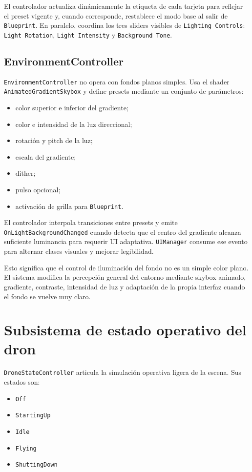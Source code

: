 \documentclass[12pt,letterpaper]{article}
\begin{document}
\noindent El controlador actualiza dinámicamente la etiqueta de cada tarjeta para reflejar el preset vigente y, cuando corresponde, restablece el modo base al salir de \texttt{Blueprint}. En paralelo, coordina los tres sliders visibles de \texttt{Lighting Controls}: \texttt{Light Rotation}, \texttt{Light Intensity} y \texttt{Background Tone}.

\subsection{EnvironmentController}
\texttt{EnvironmentController} no opera con fondos planos simples. Usa el shader \texttt{AnimatedGradientSkybox} y define presets mediante un conjunto de parámetros:
\begin{itemize}
    \item color superior e inferior del gradiente;
    \item color e intensidad de la luz direccional;
    \item rotación y pitch de la luz;
    \item escala del gradiente;
    \item dither;
    \item pulso opcional;
    \item activación de grilla para \texttt{Blueprint}.
\end{itemize}

\noindent El controlador interpola transiciones entre presets y emite \texttt{OnLightBackgroundChanged} cuando detecta que el centro del gradiente alcanza suficiente luminancia para requerir UI adaptativa. \texttt{UIManager} consume ese evento para alternar clases visuales y mejorar legibilidad.

\noindent Esto significa que el control de iluminación del fondo no es un simple color plano. El sistema modifica la percepción general del entorno mediante skybox animado, gradiente, contraste, intensidad de luz y adaptación de la propia interfaz cuando el fondo se vuelve muy claro.

\section{Subsistema de estado operativo del dron}
\texttt{DroneStateController} articula la simulación operativa ligera de la escena. Sus estados son:
\begin{itemize}
    \item \texttt{Off}
    \item \texttt{StartingUp}
    \item \texttt{Idle}
    \item \texttt{Flying}
    \item \texttt{ShuttingDown}
\end{itemize}
\end{document}
